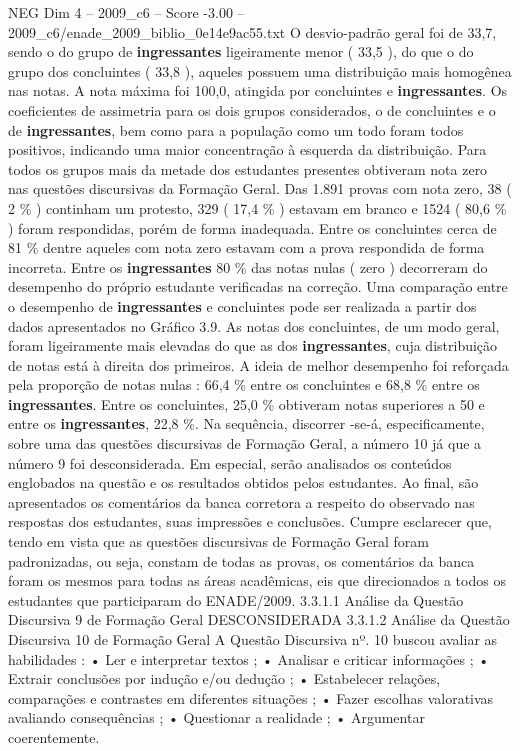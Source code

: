 \begin{textsample}{NEG Dim 4 – 2009\_c6 – Score -3.00 – 2009\_c6/enade\_2009\_biblio\_0e14e9ac55.txt}
O desvio-padrão geral foi de 33,7, sendo o do grupo de \textbf{ingressantes} ligeiramente menor ( 33,5 ), do que o do grupo dos concluintes ( 33,8 ), aqueles possuem uma distribuição mais homogênea nas notas.
A nota máxima foi 100,0, atingida por concluintes e \textbf{ingressantes}.
Os coeficientes de assimetria para os dois grupos considerados, o de concluintes e o de \textbf{ingressantes}, bem como para a população como um todo foram todos positivos, indicando uma maior concentração à esquerda da distribuição.
Para todos os grupos mais da metade dos estudantes presentes obtiveram nota zero nas questões discursivas da Formação Geral.
Das 1.891 provas com nota zero, 38 ( 2 \% ) continham um protesto, 329 ( 17,4 \% ) estavam em branco e 1524 ( 80,6 \% ) foram respondidas, porém de forma inadequada.
Entre os concluintes cerca de 81 \% dentre aqueles com nota zero estavam com a prova respondida de forma incorreta.
Entre os \textbf{ingressantes} 80 \% das notas nulas ( zero ) decorreram do desempenho do próprio estudante verificadas na correção.
Uma comparação entre o desempenho de \textbf{ingressantes} e concluintes pode ser realizada a partir dos dados apresentados no Gráfico 3.9.
As notas dos concluintes, de um modo geral, foram ligeiramente mais elevadas do que as dos \textbf{ingressantes}, cuja distribuição de notas está à direita dos primeiros.
A ideia de melhor desempenho foi reforçada pela proporção de notas nulas : 66,4 \% entre os concluintes e 68,8 \% entre os \textbf{ingressantes}.
Entre os concluintes, 25,0 \% obtiveram notas superiores a 50 e entre os \textbf{ingressantes}, 22,8 \%.
Na sequência, discorrer -se-á, especificamente, sobre uma das questões discursivas de Formação Geral, a número 10 já que a número 9 foi desconsiderada.
Em especial, serão analisados os conteúdos englobados na questão e os resultados obtidos pelos estudantes.
Ao final, são apresentados os comentários da banca corretora a respeito do observado nas respostas dos estudantes, suas impressões e conclusões.
Cumpre esclarecer que, tendo em vista que as questões discursivas de Formação Geral foram padronizadas, ou seja, constam de todas as provas, os comentários da banca foram os mesmos para todas as áreas acadêmicas, eis que direcionados a todos os estudantes que participaram do ENADE/2009. 3.3.1.1 Análise da Questão Discursiva 9 de Formação Geral DESCONSIDERADA 3.3.1.2 Análise da Questão Discursiva 10 de Formação Geral A Questão Discursiva nº. 10 buscou avaliar as habilidades : • Ler e interpretar textos ; • Analisar e criticar informações ; • Extrair conclusões por indução e/ou dedução ; • Estabelecer relações, comparações e contrastes em diferentes situações ; • Fazer escolhas valorativas avaliando consequências ; • Questionar a realidade ; • Argumentar coerentemente.

\end{textsample}
